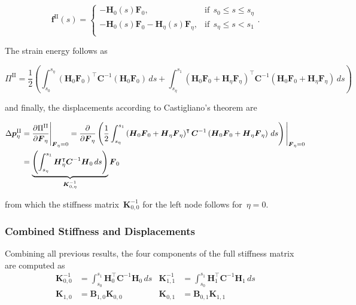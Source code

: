 \begin{equation}
\boldsymbol{f}^{\mathrm{II}}(s) = \begin{cases}
-\boldsymbol{H}_{0}(s)\boldsymbol{F}_0, & \text{if}\ \ s_0 \le s \le s_\eta \\
-\boldsymbol{H}_{0}(s)\boldsymbol{F}_0 - \boldsymbol{H}_{\eta}(s)\boldsymbol{F}_\eta, & \text{if}\ \ s_\eta \le s < s_1 \\
\end{cases}.
\end{equation}

The strain energy follows as

\begin{equation}
\Pi^{\mathrm{II}} = \frac{1}{2}\left(\int_{s_0}^{s_\eta} \left(\boldsymbol{H}_{0}\boldsymbol{F}_0\right)^\intercal\boldsymbol{C}^{-1}\left(\boldsymbol{H}_{0}\boldsymbol{F}_0\right)\,ds + \int_{s_\eta}^{s_1} \left(\boldsymbol{H}_{0}\boldsymbol{F}_0 + \boldsymbol{H}_{\eta}\boldsymbol{F}_\eta\right)^\intercal\boldsymbol{C}^{-1}\left(\boldsymbol{H}_{0}\boldsymbol{F}_0 + \boldsymbol{H}_{\eta}\boldsymbol{F}_\eta\right)\,ds\right)
\end{equation}

and finally, the displacements according to Castigliano's theorem are

\begin{align}
\Delta\boldsymbol{p}^{\mathrm{II}}_\eta &= \frac{\partial \Pi^{\mathrm{II}}}{\partial \boldsymbol{F}_\eta}\Bigg|_{\boldsymbol{F}_\eta = 0} = \frac{\partial}{\partial \boldsymbol{F}_\eta}\left(\frac{1}{2}\int_{s_\eta}^{s_1} \left(\boldsymbol{H}_{0}\boldsymbol{F}_0 + \boldsymbol{H}_{\eta}\boldsymbol{F}_\eta\right)^\intercal\boldsymbol{C}^{-1}\left(\boldsymbol{H}_{0}\boldsymbol{F}_0 + \boldsymbol{H}_{\eta}\boldsymbol{F}_\eta\right)\,ds\right)\Bigg|_{\boldsymbol{F}_\eta = 0} \notag \\
&= \underbrace{\left(\int_{s_\eta}^{s_1} \boldsymbol{H}_\eta^\intercal\boldsymbol{C}^{-1}\boldsymbol{H}_0\,ds\right)}_{\boldsymbol{K}^{-1}_{0,\eta}}\boldsymbol{F}_0
\end{align}

from which the stiffness matrix~$\boldsymbol{K}^{-1}_{0,0}$ for the left node follows for~$\eta = 0$.

\subsubsection*{Combined Stiffness and Displacements}

Combining all previous results, the four components of the full stiffness matrix are computed as
%
\begin{align}
\boldsymbol{K}^{-1}_{0,0} &= \int_{s_0}^{s_1} \boldsymbol{H}_0^\intercal\boldsymbol{C}^{-1}\boldsymbol{H}_0\,ds & \boldsymbol{K}^{-1}_{1,1} &= \int_{s_0}^{s_1} \boldsymbol{H}_1^\intercal\boldsymbol{C}^{-1}\boldsymbol{H}_1\,ds \\
\boldsymbol{K}_{1,0} &= \boldsymbol{B}_{1,0}\boldsymbol{K}_{0,0} & \boldsymbol{K}_{0,1} &= \boldsymbol{B}_{0,1}\boldsymbol{K}_{1,1}
\end{align}

